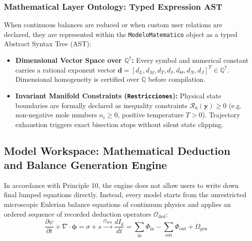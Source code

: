 \documentclass[11pt,a4paper]{article}
\begin{document}
\subsubsection{Mathematical Layer Ontology: Typed Expression AST}
When continuous balances are reduced or when custom user relations are declared, they are represented within the \texttt{ModeloMatematico} object as a typed Abstract Syntax Tree (AST):
\begin{itemize}[leftmargin=*]
    \item \textbf{Dimensional Vector Space over $\mathbb{Q}^7$:} Every symbol and numerical constant carries a rational exponent vector $\mathbf{d} = [d_L, d_M, d_T, d_I, d_\Theta, d_N, d_J]^T \in \mathbb{Q}^7$. Dimensional homogeneity is certified over $\mathbb{Q}$ before compilation.
    \item \textbf{Invariant Manifold Constraints (\texttt{Restricciones}):} Physical state boundaries are formally declared as inequality constraints $\mathcal{R}_k(\mathbf{y}) \ge 0$ (e.g. non-negative mole numbers $n_i \ge 0$, positive temperature $T > 0$). Trajectory exhaustion triggers exact bisection stops without silent state clipping.
\end{itemize}

\subsection{Model Workspace: Mathematical Deduction and Balance Generation Engine}
\label{subsec:model-workspace-deduction}

In accordance with Principle 10, the engine does not allow users to write down final lumped equations directly. Instead, every model starts from the unrestricted microscopic Eulerian balance equations of continuum physics and applies an ordered sequence of recorded deduction operators $\mathcal{O}_{\text{ded}}$:
\begin{equation}
\frac{\partial \psi}{\partial t} + \nabla \cdot \mathbf{\phi} = \sigma + s \xrightarrow{\mathcal{O}_{\text{ded}}} \frac{d I_k}{dt} = \sum_{\text{in}} \Phi_{\text{in}} - \sum_{\text{out}} \Phi_{\text{out}} + \dot{\Omega}_{\text{gen}}
\end{equation}
\end{document}
